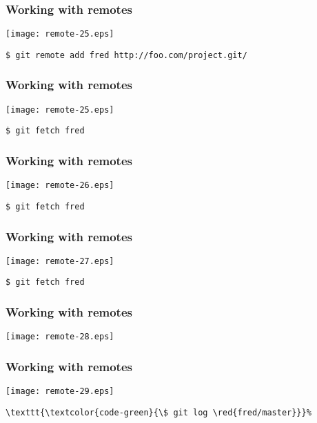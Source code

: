 \documentclass[english]{beamer}
\newcommand{\CMD}[1]{%
\texttt{\textcolor{code-green}{#1}}%
}
\newcommand{\red}[1]{%
\textcolor{code-red}{#1}%
}
\begin{document}
\begin{frame}[fragile]
\frametitle{Working with remotes}

\texttt{[image: remote-25.eps]}

\CMD{\$ git remote add \red{fred} http://foo.com/project.git/}
\vspace{\textheight}
\end{frame}

\begin{frame}[fragile]
\frametitle{Working with remotes}

\texttt{[image: remote-25.eps]}

\CMD{\$ git fetch \red{fred}}
\vspace{\textheight}
\end{frame}

\begin{frame}[fragile]
\frametitle{Working with remotes}

\texttt{[image: remote-26.eps]}

\CMD{\$ git fetch \red{fred}}
\vspace{\textheight}
\end{frame}

\begin{frame}[fragile]
\frametitle{Working with remotes}

\texttt{[image: remote-27.eps]}

\CMD{\$ git fetch \red{fred}}
\vspace{\textheight}
\end{frame}

\begin{frame}[fragile]
\frametitle{Working with remotes}

\texttt{[image: remote-28.eps]}

\vspace{\textheight}
\end{frame}

\begin{frame}[fragile]
\frametitle{Working with remotes}

\texttt{[image: remote-29.eps]}

\begin{Verbatim}[commandchars=\\\{\}]
\CMD{\$ git log \red{fred/master}}
\end{Verbatim}

\vspace{\textheight}
\end{frame}
\end{document}
